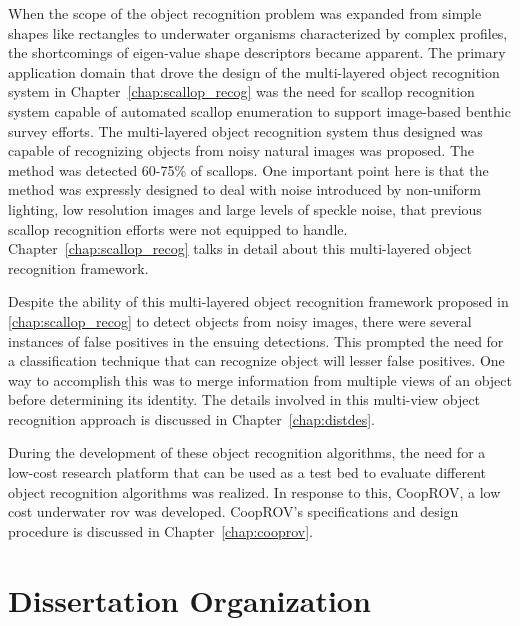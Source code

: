 When the scope of the object recognition problem was expanded from simple shapes like rectangles to underwater organisms characterized by complex profiles,
the shortcomings of eigen-value shape descriptors became apparent. The primary application domain that drove the design of the multi-layered object recognition system in Chapter~\ref{chap:scallop_recog} was the need for 
scallop recognition system capable of automated scallop enumeration to support image-based benthic survey efforts. 
The multi-layered object recognition system thus designed was capable of recognizing objects from noisy natural images was proposed. The method was detected 60-75\% of scallops. One important point here is that the method was expressly designed to deal with noise introduced by non-uniform lighting, low resolution images and large levels of speckle noise, that previous scallop recognition efforts were not equipped to handle. Chapter~\ref{chap:scallop_recog} talks in detail about this multi-layered object recognition framework.

Despite the ability of this multi-layered object recognition framework proposed in \ref{chap:scallop_recog} to detect objects from noisy images, there were 
several instances of false positives in the ensuing detections. This prompted the need for a classification technique that can recognize object will lesser
false positives. One way to accomplish this was to merge information from multiple views of an object before determining its identity. The details involved in this
multi-view object recognition approach is discussed in Chapter~\ref{chap:distdes}.

During the development of these object recognition algorithms, the need for a low-cost research platform 
that can be used as a test bed to evaluate different object recognition algorithms was realized.
In response to this, CoopROV, a low cost underwater \gls{rov} was developed. CoopROV's specifications and 
design procedure is discussed in Chapter~\ref{chap:cooprov}.

\section{Dissertation Organization}

